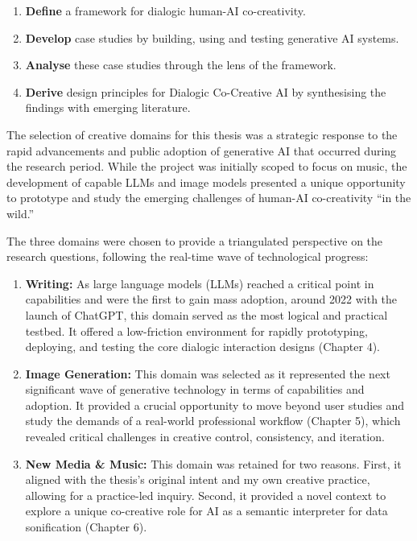 \begin{enumerate}
    \item \textbf{Define} a framework for dialogic human-AI co-creativity.
    \item \textbf{Develop} case studies by building, using and testing generative AI systems.
    \item \textbf{Analyse} these case studies through the lens of the framework.
    \item \textbf{Derive} design principles for Dialogic Co-Creative AI by synthesising the findings with emerging literature.
\end{enumerate}


The selection of creative domains for this thesis was a strategic response to the rapid advancements and public adoption of generative AI that occurred during the research period. While the project was initially scoped to focus on music, the development of capable LLMs and image models presented a unique opportunity to prototype and study the emerging challenges of human-AI co-creativity ``in the wild.''

The three domains were chosen to provide a triangulated perspective on the research questions, following the real-time wave of technological progress:
\begin{enumerate}
    \item \textbf{Writing:} As large language models (LLMs) reached a critical point in capabilities and were the first to gain mass adoption, around 2022 with the launch of ChatGPT, this domain served as the most logical and practical testbed. It offered a low-friction environment for rapidly prototyping, deploying, and testing the core dialogic interaction designs (Chapter 4).
    \item \textbf{Image Generation:} This domain was selected as it represented the next significant wave of generative technology in terms of capabilities and adoption. It provided a crucial opportunity to move beyond user studies and study the demands of a real-world professional workflow (Chapter 5), which revealed critical challenges in creative control, consistency, and iteration.
    \item \textbf{New Media \& Music:} This domain was retained for two reasons. First, it aligned with the thesis's original intent and my own creative practice, allowing for a practice-led inquiry. Second, it provided a novel context to explore a unique co-creative role for AI as a semantic interpreter for data sonification (Chapter 6).
\end{enumerate}


